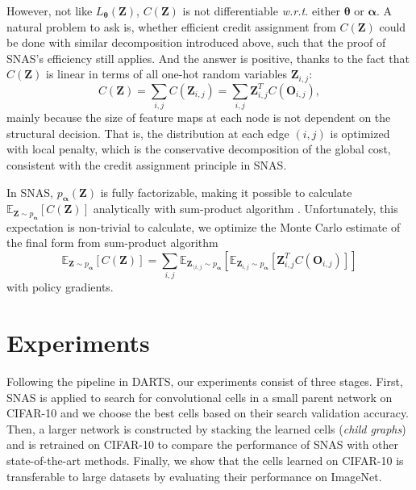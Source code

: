 \documentclass{article} \usepackage{iclr2019_conference,times}
\begin{document}
However, not like $L_{\bm{\theta}}(\bm{Z})$, $C(\bm{Z})$ is not differentiable \textit{w.r.t.} either $\bm{\theta}$ or $\bm{\alpha}$. A natural problem to ask is, whether efficient credit assignment from $C(\bm{Z})$ could be done with similar decomposition introduced above, such that the proof of SNAS's efficiency still applies. And the answer is positive, thanks to the fact that $C(\bm{Z})$ is linear in terms of all one-hot random variables $\bm{Z}_{i, j}$: 
\begin{equation}
C(\bm{Z}) = \sum_{i,j} C(\bm{Z}_{i,j}) = \sum_{i,j}\bm{Z}_{i,j}^{T}C(\bm{O}_{i,j}), 
\end{equation}
mainly because the size of feature maps at each node is not dependent on the structural decision. That is, the distribution at each edge $(i,j)$ is optimized with local penalty, which is the conservative decomposition of the global cost, consistent with the credit assignment principle in SNAS. 

In SNAS, $p_{\bm{\alpha}}(\bm{Z})$ is fully factorizable, making it possible to calculate $\mathbb{E}_{\bm{Z}\sim p_{\bm{\alpha}}}[C(\bm{Z})]$ analytically with sum-product algorithm \citep{kschischang2001factor}. Unfortunately, this expectation is non-trivial to calculate, we optimize the Monte Carlo estimate of the final form from sum-product algorithm
\begin{equation}
\mathbb{E}_{\bm{Z}\sim p_{\bm{\alpha}}}[C(\bm{Z})] = \sum_{i,j}\mathbb{E}_{\bm{Z}_{\setminus i,j}\sim p_{\bm{\alpha}}}[\mathbb{E}_{\bm{Z}_{i,j}\sim p_{\bm{\alpha}}}[\bm{Z}_{i,j}^{T}C(\bm{O}_{i,j})]]
\end{equation}
with policy gradients.



\section{Experiments}

Following the pipeline in DARTS, our experiments consist of three stages. First, SNAS is applied to search for convolutional cells in a small parent network on CIFAR-10 and we choose the best cells based on their search validation accuracy. Then, a larger network is constructed by stacking the learned cells (\textit{child graphs}) and is retrained on CIFAR-10 to compare the performance of SNAS with other state-of-the-art methods. Finally, we show that the cells learned on CIFAR-10 is transferable to large datasets by evaluating their performance on ImageNet.
\end{document}
